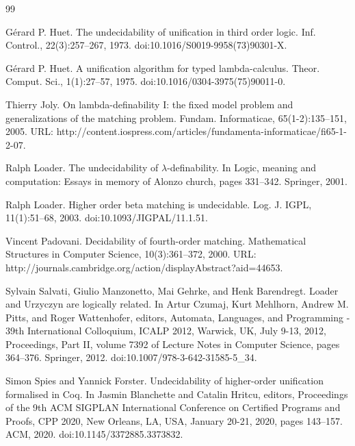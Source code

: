 \documentclass[10pt,a4paper]{amsart}
\begin{document}
\begin{thebibliography}{99}
\par\noindent  [9]  Gérard P. Huet.  The undecidability of unification in third order logic.  Inf. Control., 22(3):257–267, 1973.  doi:10.1016/S0019-9958(73)90301-X.  
 
\par\noindent  [10]  Gérard P. Huet.  A unification algorithm for typed lambda-calculus.  Theor. Comput. Sci., 1(1):27–57, 1975.  doi:10.1016/0304-3975(75)90011-0.  
 
\par\noindent  [11]  Thierry Joly.  On lambda-definability I: the fixed model problem and generalizations of the matching problem.  Fundam. Informaticae, 65(1-2):135–151, 2005.  URL: http://content.iospress.com/articles/fundamenta-informaticae/fi65-1-2-07.  
 
\par\noindent  [12]  Ralph Loader.  The undecidability of $\lambda$-definability.  In Logic, meaning and computation: Essays in memory of Alonzo church, pages 331–342. Springer, 2001.  
 
\par\noindent  [13]  Ralph Loader.  Higher order beta matching is undecidable.  Log. J. IGPL, 11(1):51–68, 2003.  doi:10.1093/JIGPAL/11.1.51.  
 
\par\noindent  [14]  Vincent Padovani.  Decidability of fourth-order matching.  Mathematical Structures in Computer Science, 10(3):361–372, 2000.  URL: http://journals.cambridge.org/action/displayAbstract?aid=44653.  
 
\par\noindent  [15]  Sylvain Salvati, Giulio Manzonetto, Mai Gehrke, and Henk Barendregt.  Loader and Urzyczyn are logically related.  In Artur Czumaj, Kurt Mehlhorn, Andrew M. Pitts, and Roger Wattenhofer, editors, Automata, Languages, and Programming - 39th International Colloquium, ICALP 2012, Warwick, UK, July 9-13, 2012, Proceedings, Part II, volume 7392 of Lecture Notes in Computer Science, pages 364–376. Springer, 2012.  doi:10.1007/978-3-642-31585-5\_34.  
 
\par\noindent  [16]  Simon Spies and Yannick Forster.  Undecidability of higher-order unification formalised in Coq.  In Jasmin Blanchette and Catalin Hritcu, editors, Proceedings of the 9th ACM SIGPLAN International Conference on Certified Programs and Proofs, CPP 2020, New Orleans, LA, USA, January 20-21, 2020, pages 143–157. ACM, 2020.  doi:10.1145/3372885.3373832.  
 

\end{thebibliography}
\end{document}
